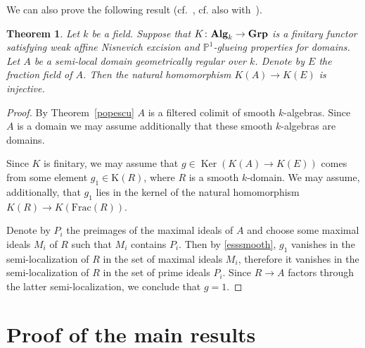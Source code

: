 \documentclass[oneside, 11pt]{amsart} \pdfoutput=1
\newcommand{\Ker}{\mathop{\mathrm{Ker}}\nolimits}
\numberwithin{equation}{section}
\newtheorem{theorem}[lemma]{Theorem}
\theoremstyle{definition}
\newcommand{\catname}[1]{{\normalfont\textbf{#1}}} %
\begin{document}
We can also prove the following result (cf.~\cite[Th{\'e}or{\`e}me~1.1]{CTO92}, cf. also with~\cite[Proposition~2.2]{AHW20}).
\begin{theorem}\label{thm:gb}
Let $k$ be a field.
Suppose that $K\colon\catname{Alg}_k\rightarrow\catname{Grp}$
is a finitary functor satisfying weak affine Nisnevich excision and $\mathbb{P}^1$-glueing properties for domains. 
Let $A$ be a semi-local domain geometrically regular over $k$. 
Denote by $E$ the fraction field of $A$.
Then the natural homomorphism $K(A) \to K(E)$ is injective.
\end{theorem}
\begin{proof}
By Theorem~\ref{popescu} $A$ is a filtered colimit of smooth $k$-algebras. Since $A$ is a domain we may assume additionally that these smooth $k$-algebras are domains.

Since $K$ is finitary, we may assume that $g \in \Ker(K(A) \to K(E))$ comes from some element $g_1\in\mathrm K(R)$, where $R$ is a smooth $k$-domain. We may assume, additionally, that $g_1$ lies in the kernel of the natural homomorphism $K(R) \to K(\mathrm{Frac}(R))$.

Denote by $P_i$ the preimages of the maximal ideals of $A$ and choose some maximal ideals $M_i$ of $R$ such that $M_i$ contains $P_i$. Then by \cref{esssmooth}, $g_1$ vanishes in the semi-localization of $R$ in the set of maximal ideals $M_i$, therefore it vanishes in the semi-localization of $R$ in the set of prime ideals $P_i$. Since $R\rightarrow A$ factors through the latter semi-localization, we conclude that $g=1$. 
\end{proof}

\section{Proof of the main results} \label{sec:main-results}
\end{document}
